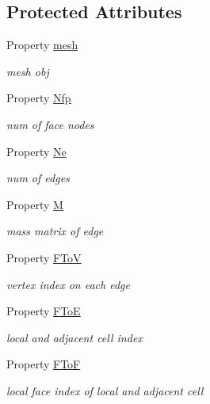\subsection*{Protected Attributes}
\begin{DoxyCompactItemize}
\item 
Property \hyperlink{class_ndg_side_edge3d_a60de04f2f3079b24be4de0e1cab6e116}{mesh}
\begin{DoxyCompactList}\small\item\em mesh obj \end{DoxyCompactList}\item 
Property \hyperlink{class_ndg_side_edge3d_a949b74291393075cbd85d093b44f95a9}{Nfp}
\begin{DoxyCompactList}\small\item\em num of face nodes \end{DoxyCompactList}\item 
Property \hyperlink{class_ndg_side_edge3d_ae2b65a70ab15a2d90aef80a6319612f0}{Ne}
\begin{DoxyCompactList}\small\item\em num of edges \end{DoxyCompactList}\item 
Property \hyperlink{class_ndg_side_edge3d_af4475457effd9a9126f3ea737a79ddf6}{M}
\begin{DoxyCompactList}\small\item\em mass matrix of edge \end{DoxyCompactList}\item 
Property \hyperlink{class_ndg_side_edge3d_a6994059d4ed5bd73c5f6801ab5234322}{F\+ToV}
\begin{DoxyCompactList}\small\item\em vertex index on each edge \end{DoxyCompactList}\item 
Property \hyperlink{class_ndg_side_edge3d_aa1b8b36422ce2fbe9f1eeed310a29652}{F\+ToE}
\begin{DoxyCompactList}\small\item\em local and adjacent cell index \end{DoxyCompactList}\item 
Property \hyperlink{class_ndg_side_edge3d_ab9c4b2bb43d2afb9fe7d52923b8a799a}{F\+ToF}
\begin{DoxyCompactList}\small\item\em local face index of local and adjacent cell \end{DoxyCompactList}\item 

\end{DoxyCompactItemize}
